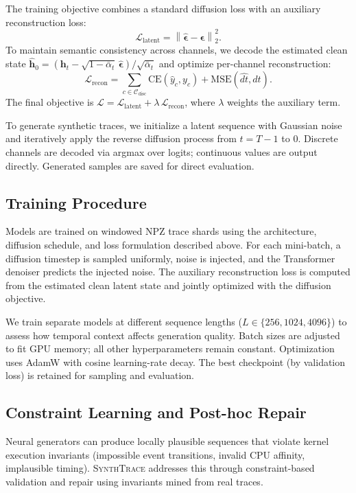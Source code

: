 The training objective combines a standard diffusion loss with an auxiliary reconstruction loss:
\[
\mathcal{L}_{\text{latent}} = \left\lVert \hat{\boldsymbol{\epsilon}} - \boldsymbol{\epsilon} \right\rVert_2^2.
\]
To maintain semantic consistency across channels, we decode the estimated clean state $\hat{\mathbf{h}}_0 = (\mathbf{h}_t - \sqrt{1-\bar{\alpha}_t}\,\hat{\boldsymbol{\epsilon}}) / \sqrt{\bar{\alpha}_t}$ and optimize per-channel reconstruction:
\[
\mathcal{L}_{\text{recon}} = \sum_{c \in \mathcal{C}_{\text{disc}}} \mathrm{CE}(\hat{y}_c, y_c) + \mathrm{MSE}(\widehat{dt}, dt).
\]
The final objective is $\mathcal{L} = \mathcal{L}_{\text{latent}} + \lambda\,\mathcal{L}_{\text{recon}}$, where $\lambda$ weights the auxiliary term.


To generate synthetic traces, we initialize a latent sequence with Gaussian noise and iteratively apply the reverse diffusion process from $t=T-1$ to $0$. Discrete channels are decoded via argmax over logits; continuous values are output directly. Generated samples are saved for direct evaluation.




\subsection{Training Procedure}
\label{sec:training}

Models are trained on windowed NPZ trace shards using the architecture, diffusion schedule, and loss formulation described above. For each mini-batch, a diffusion timestep is sampled uniformly, noise is injected, and the Transformer denoiser predicts the injected noise. The auxiliary reconstruction loss is computed from the estimated clean latent state and jointly optimized with the diffusion objective.

We train separate models at different sequence lengths ($L \in \{256, 1024, 4096\}$) to assess how temporal context affects generation quality. Batch sizes are adjusted to fit GPU memory; all other hyperparameters remain constant. Optimization uses AdamW with cosine learning-rate decay. The best checkpoint (by validation loss) is retained for sampling and evaluation.


\subsection{Constraint Learning and Post-hoc Repair}
\label{sec:constraints-repair}

Neural generators can produce locally plausible sequences that violate kernel execution invariants (impossible event transitions, invalid CPU affinity, implausible timing). \textsc{SynthTrace} addresses this through constraint-based validation and repair using invariants mined from real traces.

